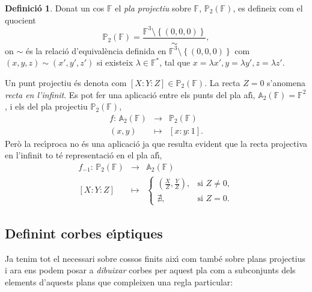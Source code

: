\documentclass[12pt,twoside,catalan,a4paper]{book}%
\numberwithin{figure}{section}		%
\theoremstyle{definition}   			%
\newtheorem{defi}{Definici\'o}[chapter]%
\def\ce{corba e\lgem{}\'{\i}ptica}%
\def\ces{corbes e\lgem{}\'{\i}ptiques}%
\def\cfs{cossos finits}%
\newcommand{\Proy}{\ensuremath{\mathbb{P}_{2}}}%
\newcommand{\K}{\ensuremath{\mathbb{K}}}%
\newcommand{\F}{\ensuremath{\mathbb{F}}}%
\theoremstyle{saltolinea}   			%
\begin{document}
\begin{defi}\label{def:coorproj}
Donat un cos $\F$ el \emph{pla projectiu} sobre $\F$, $\Proy(\F)$, es defineix com el quocient
$$\Proy(\F)=\frac{\F^3\setminus\left\{(0,0,0)\right\}}{\sim},$$
on $\sim$ \'es la relaci\'o d'equival\`encia definida en $\F^3\setminus\left\{(0,0,0)\right\}$ com $(x,y,z)\sim (x',y',z')$ si existeix $\lambda\in\F^*$, tal que $x=\lambda x', y=\lambda y', z=\lambda z'$.
\end{defi}
Un punt projectiu \'es denota com $[X:Y:Z]\in\Proy(\F)$. La recta $Z=0$ s'anomena \emph{recta en l'infinit}. Es pot fer una aplicaci\'o entre els punts del pla af\'{\i}, $\mathbb{A}_{2}(\F)=\F^{2}$, i els del  pla projectiu $\Proy(\F)$,
$$\begin{array}{rcl}f:\,\mathbb{A}_{2}(\F) & \longrightarrow & \Proy(\F)\\ (x,y) & \longmapsto & \left[x:y:1\right].\end{array}$$
Per\`o la rec\'{\i}proca no \'es una aplicaci\'o ja que resulta evident que la recta projectiva en l'infinit to t\'e representaci\'o en el pla af\'{\i},
$$\begin{array}{rcl}f_{-1}:\,\Proy(\F) & \longrightarrow & \mathbb{A}_{2}(\F)\\ \left[X:Y:Z\right] & \longmapsto & \begin{cases}\left(\frac{X}{Z},\frac{Y}{Z}\right), & \text{si }Z\ne 0,\\ \nexists, & \text{si }Z=0.\end{cases}\end{array}$$


\subsection{Definint \ces}\label{subsec:def_ces}

Ja tenim tot el necessari sobre \cfs{} aix\'{\i} com tamb\'e sobre plans projectius i ara ens podem posar a \emph{dibuixar} corbes per aquest pla com a subconjunts dels elements d'aquests plans que compleixen una regla particular:

\end{document}
